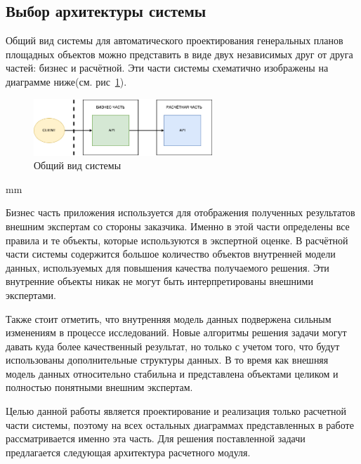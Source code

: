 \subsection*{\large{Выбор архитектуры системы}}

Общий вид системы для автоматического проектирования генеральных планов площадных объектов можно представить в виде
двух независимых друг от друга частей: бизнес и расчётной.
Эти части системы схематично изображены на диаграмме ниже(см. рис\ \ref{pic:architecture__system-diagram}).

\begin{figure}[H]
	\hspace*{-2.5 cm}\includegraphics[width=0.6\textwidth, left]{architecture/pictures/system}
	\caption{Общий вид системы}
	\label{pic:architecture__system-diagram}
\end{figure}
 mm

Бизнес часть приложения используется для отображения полученных результатов внешним экспертам со стороны заказчика.
Именно в этой части определены все правила и те объекты, которые используются в экспертной оценке.
В расчётной части системы содержится большое количество объектов внутренней модели данных, используемых для повышения
качества получаемого решения. Эти внутренние объекты никак не могут быть интерпретированы внешними экспертами.

Также стоит отметить, что внутренняя модель данных подвержена сильным изменениям в процессе исследований.
Новые алгоритмы решения задачи могут давать куда более качественный результат, но только с учетом того, что
будут использованы дополнительные структуры данных. В то время как внешняя модель данных относительно стабильна
и представлена объектами целиком и полностью понятными внешним экспертам.

Целью данной работы является проектирование и реализация только расчетной части системы, поэтому на всех остальных
диаграммах представленных в работе рассматривается именно эта часть.
Для решения поставленной задачи предлагается следующая архитектура расчетного модуля.

